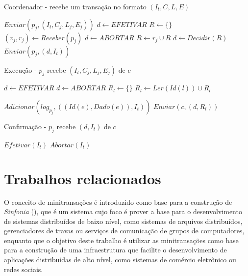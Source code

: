 \documentclass[11pt,twoside,a4paper]{book}
\begin{document}
\begin{algorithm}
\caption{Coordenador - recebe um transação no formato $(I_t, C, L, E)$}
\label{alg:mini_coordenador}
\begin{algorithmic}[1]
	\State $Enviar(p_j, (I_t, C_j, L_j, E_j))$
\EndFor
\State $d \gets EFETIVAR$
\State $R \gets \{\}$
	\State $(v_j, r_j) \gets Receber(p_j)$
		\State $d \gets ABORTAR$
	\Else
		\State $R \gets r_j \cup R$
	\EndIf
\EndFor
{}
	\State $d \gets Decidir(R)$
\EndIf
{}
	\State $Enviar(p_j, (d, I_t))$
\EndFor
\end{algorithmic}
\end{algorithm}

\begin{algorithm}
\caption{Execução - $p_j$ recebe $(I_t, C_j, L_j, E_j)$ de $c$}
\label{alg:mini_participante1}
\begin{algorithmic}[1]
\State $d \gets EFETIVAR$
		\State $d \gets ABORTAR$
	\EndIf
\EndFor
\State $R_l \gets \{\}$
		\State $R_l \gets Ler(Id(l)) \cup R_l$
	\EndFor
	
		\State $Adicionar(log_{p_j}, ( (Id(e), Dado(e)), I_t ) )$
	\EndFor
\EndIf
\State $Enviar(c, (d, R_l))$
\end{algorithmic}
\end{algorithm}

\begin{algorithm}
\caption{Confirmação - $p_j$ recebe $(d, I_t)$ de $c$}
\label{alg:mini_participante2}
\begin{algorithmic}[1]
	\State $Efetivar(I_t)$
\Else
	\State $Abortar(I_t)$
\EndIf
\end{algorithmic}
\end{algorithm}

\section{Trabalhos relacionados}
\label{sec:trabalhos_relacionados}
O conceito de minitransações é introduzido como base para a construção de \emph{Sinfonia} (\cite{sinfonia}), que é um sistema cujo foco é prover a base para o desenvolvimento de sistemas distribuídos de baixo nível, como sistemas de arquivos distribuídos, gerenciadores de travas ou serviços de comunicação de grupos de computadores, enquanto que o objetivo deste trabalho é utilizar as minitransações como base para a construção de uma infraestrutura que facilite o desenvolvimento de aplicações distribuídas de alto nível, como sistemas de comércio eletrônico ou redes sociais. 
\end{document}
